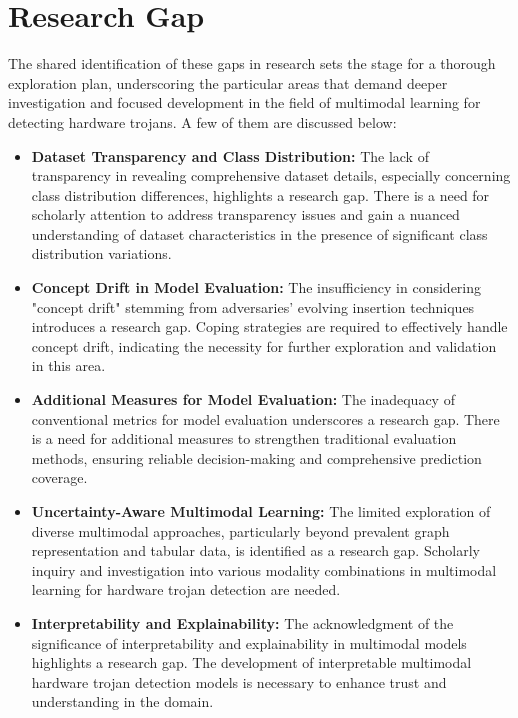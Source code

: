 \section*{Research Gap}

The shared identification of these gaps in research sets the stage for a thorough exploration plan, underscoring the particular areas that demand deeper investigation and focused development in the field of multimodal learning for detecting hardware trojans. A few of them are discussed below:

\begin{itemize}

    \item \textbf{Dataset Transparency and Class Distribution:} The lack of transparency in revealing comprehensive dataset details, especially concerning class distribution differences, highlights a research gap. There is a need for scholarly attention to address transparency issues and gain a nuanced understanding of dataset characteristics in the presence of significant class distribution variations.
    
    \item \textbf{Concept Drift in Model Evaluation:} The insufficiency in considering "concept drift" stemming from adversaries' evolving insertion techniques introduces a research gap. Coping strategies are required to effectively handle concept drift, indicating the necessity for further exploration and validation in this area.
    
    \item \textbf{Additional Measures for Model Evaluation:} The inadequacy of conventional metrics for model evaluation underscores a research gap. There is a need for additional measures to strengthen traditional evaluation methods, ensuring reliable decision-making and comprehensive prediction coverage.
    
    
    \item \textbf{Uncertainty-Aware Multimodal Learning:} The limited exploration of diverse multimodal approaches, particularly beyond prevalent graph representation and tabular data, is identified as a research gap. Scholarly inquiry and investigation into various modality combinations in multimodal learning for hardware trojan detection are needed.
    

    
    \item \textbf{Interpretability and Explainability:} The acknowledgment of the significance of interpretability and explainability in multimodal models highlights a research gap. The development of interpretable multimodal hardware trojan detection models is necessary to enhance trust and understanding in the domain.

\end{itemize}



